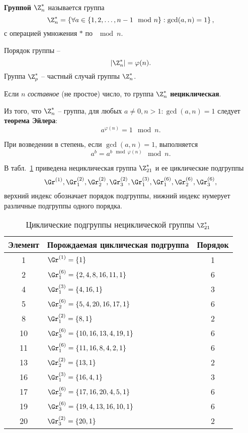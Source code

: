\textbf{Группой $\Z_n^*$} называется группа
    \[ \Z_n^* = \left\{ \forall a \in \left\{ 1, 2,  \dots,  n-1 \mod n \right\} : \gcd(a,n) = 1 \right\}, \]
с операцией умножения $\ast$ по $\mod n$.

Порядок группы --
    \[ |\Z_n^*| = \varphi(n). \]
Группа $\Z_p^*$ -- частный случай группы $\Z_n^*$.

Если $n$ \emph{составное} (не простое) число, то группа $\Z_n^*$ \textbf{нециклическая}.

Из того, что $\Z_n^*$ -- группа, для любых $a \neq 0, n > 1: \gcd(a,n) = 1$ следует \textbf{теорема Эйлера}:
    \[ a^{\varphi(n)} = 1 \mod n. \]

При возведении в степень, если $\gcd(a,n) = 1$, выполняется
    \[ a^b = a^{b \mod \varphi(n)} \mod n. \]

\example
В табл.~\ref{tab:Zn-sample} приведена нециклическая группа $\Z_{21}^*$ и ее циклические подгруппы
    \[ \Gr^{(1)}, \Gr_1^{(2)}, \Gr_2^{(2)}, \Gr_3^{(2)}, \Gr_1^{(3)}, \Gr_1^{(6)}, \Gr_2^{(6)}, \Gr_3^{(6)}, \]
верхний индекс обозначает порядок подгруппы, нижний индекс нумерует различные подгруппы одного порядка.

\begin{table}[!ht]
    \centering
    \caption{Циклические подгруппы нециклической группы $\Z_{21}^*$\label{tab:Zn-sample}}
    \begin{tabular}{|c|l|c|}
        \hline
        Элемент & Порождаемая циклическая подгруппа & Порядок \\
        \hline
        1  & $\Gr^{(1)} = \{ 1 \}$ & 1 \\
        2  & $\Gr_1^{(6)} = \{ 2, 4, 8, 16, 11, 1 \}$ & 6 \\
        4  & $\Gr_1^{(3)} = \{ 4, 16, 1 \}$ & 3 \\
        5  & $\Gr_2^{(6)} = \{ 5, 4, 20, 16, 17, 1 \}$ & 6 \\
        8  & $\Gr_1^{(2)} = \{ 8, 1 \}$ & 2 \\
        10 & $\Gr_3^{(6)} = \{ 10, 16, 13, 4, 19, 1 \}$ & 6 \\
        11 & $\Gr_1^{(6)} = \{ 11, 16, 8, 4, 2, 1 \}$ & 6 \\
        13 & $\Gr_2^{(2)} = \{ 13, 1 \}$ & 2 \\
        16 & $\Gr_1^{(3)} = \{ 16, 4, 1 \}$ & 3 \\
        17 & $\Gr_2^{(6)} = \{ 17, 16, 20, 4, 5, 1 \}$ & 6 \\
        19 & $\Gr_3^{(6)} = \{ 19, 4, 13, 16, 10, 1 \}$ & 6 \\
        20 & $\Gr_3^{(2)} = \{ 20, 1 \}$ & 2 \\
        \hline
    \end{tabular}
\end{table}
\exampleend

